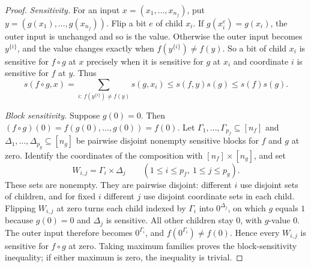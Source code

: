 \documentclass[11pt]{article}
\theoremstyle{definition}
\theoremstyle{remark}
\begin{document}
\begin{proof}
\emph{Sensitivity.}
For an input $x=(x_1,\ldots,x_{n_f})$, put
$y=(g(x_1),\ldots,g(x_{n_f}))$.
Flip a bit \(e\) of child \(x_i\). If \(g(x_i^e)=g(x_i)\), the outer input is unchanged and so is the value. Otherwise the outer input becomes \(y^{\{i\}}\), and the value changes exactly when \(f(y^{\{i\}})\ne f(y)\).
So a bit of child $x_i$ is sensitive for $f\circ g$ at \(x\) precisely when it is
sensitive for $g$ at $x_i$ and coordinate $i$ is sensitive for $f$ at $y$.
Thus
\[
 s(f\circ g,x)
   =\sum_{i:\,f(y^{\{i\}})\ne f(y)}s(g,x_i)
   \leq s(f,y)s(g)
   \leq s(f)s(g).
\]

\emph{Block sensitivity.}
Suppose $g(0)=0$. Then \((f\circ g)(0)=f(g(0),\ldots,g(0))=f(0)\).
Let $\Gamma_1,\ldots,\Gamma_{p_f}\subseteq[n_f]$ and
$\Delta_1,\ldots,\Delta_{p_g}\subseteq[n_g]$ be pairwise disjoint nonempty sensitive blocks for
$f$ and $g$ at zero. Identify the coordinates of the composition with
$[n_f]\times[n_g]$, and set
\[
 W_{i,j}=\Gamma_i\times \Delta_j\qquad(1\le i\le p_f,\ 1\le j\le p_g).
\]
These sets are nonempty. They are pairwise disjoint: different $i$ use
disjoint sets of children, and for fixed $i$ different $j$ use
disjoint coordinate sets in each child.
Flipping $W_{i,j}$ at zero turns each child indexed by $\Gamma_i$ into \(0^{\Delta_j}\), on which \(g\) equals \(1\) because \(g(0)=0\) and \(\Delta_j\) is sensitive. All other children stay \(0\), with \(g\)-value \(0\).
The outer input therefore becomes $0^{\Gamma_i}$, and \(f(0^{\Gamma_i})\ne f(0)\).
Hence every $W_{i,j}$ is sensitive for $f\circ g$ at zero.
Taking maximum families proves the block-sensitivity inequality;
if either maximum is zero, the inequality is trivial.
\end{proof}
\end{document}
